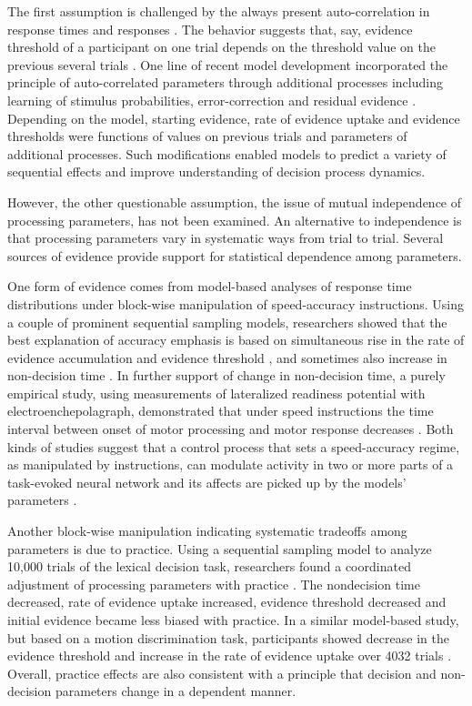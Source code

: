 \documentclass[12pt]{report}
\begin{document}
The first assumption is challenged by the always present auto-correlation in response times and responses \citep{PerVan2002, JonCur2013}. The behavior suggests that, say, evidence threshold of a participant on one trial depends on the threshold value on the previous several trials \citep{VanMal2004}. One line of recent model development incorporated the principle of auto-correlated parameters through additional processes including learning of stimulus probabilities, error-correction and residual evidence \citep{ChoNys2002,WagFar2004,BroMar2008,GaoWon2009,GolWon2012}. Depending on the model, starting evidence, rate of evidence uptake and evidence thresholds were functions of values on previous trials and parameters of additional processes. Such modifications enabled models to predict a variety of sequential effects and improve understanding of decision process dynamics.

However, the other questionable assumption, the issue of mutual independence of processing parameters, has not been examined. An alternative to independence is that processing parameters vary in systematic ways from trial to trial. Several sources of evidence provide support for statistical dependence among parameters.

One form of evidence comes from model-based analyses of response time distributions under block-wise manipulation of speed-accuracy instructions. Using a couple of prominent sequential sampling models, researchers showed that the best explanation of accuracy emphasis is based on simultaneous rise in the rate of evidence accumulation and evidence threshold \citep{VanTue2007,VanTue2011,RaeHea2014}, and sometimes also increase in non-decision time \citep{VosRot2004,ZhaRow2014}. In further support of change in non-decision time, a purely empirical study, using measurements of lateralized readiness potential with electroenchepolagraph, demonstrated that under speed instructions the time interval between onset of motor processing and motor response decreases \citep{RinOsm2004}. Both kinds of studies suggest that a control process that sets a speed-accuracy regime, as manipulated by instructions, can modulate activity in two or more parts of a task-evoked neural network and its affects are picked up by the models' parameters  \citep{Wan2008,HarSch2011,TurFor2013,ColBas2014}.

Another block-wise manipulation indicating systematic tradeoffs among parameters is due to practice. Using a sequential sampling model to analyze 10,000 trials of the lexical decision task, researchers found a coordinated adjustment of processing parameters with practice \citep{DutVan2009}. The nondecision time decreased, rate of evidence uptake increased, evidence threshold decreased and initial evidence became less biased with practice. In a similar model-based study, but based on a motion discrimination task, participants showed decrease in the evidence threshold and increase in the rate of evidence uptake over 4032 trials \citep{ZhaRow2014}. Overall, practice effects are also consistent with a principle that decision and non-decision parameters change in a dependent manner. 
\end{document}
